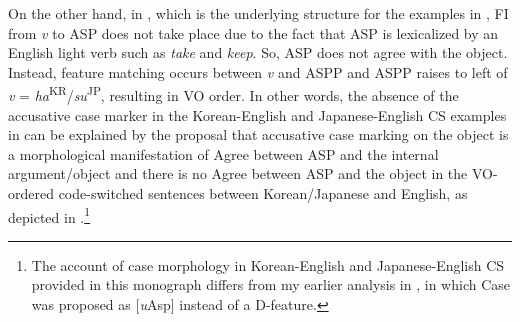 On the other hand, in , which is the underlying structure for the examples in , \ac{FI} from \textit{v} to \ac{ASP} does not take place due to the fact that \ac{ASP} is lexicalized by an English light verb such as \textit{take} and \textit{keep}. So, \ac{ASP} does not agree with the object. Instead, feature matching occurs between \textit{v} and \ac{ASP}P and \ac{ASP}P raises to left of \textit{v} = \textit{ha}\textsuperscript{KR}/\textit{su}\textsuperscript{JP}, resulting in \ac{VO} order. In other words, the absence of the accusative case marker in the Korean-English and Japanese-English \ac{CS} examples in  can be explained by the proposal that accusative case marking on the object is a morphological manifestation of Agree between \ac{ASP} and the internal argument/object and there is no Agree between \ac{ASP} and the object in the \ac{VO}-ordered code-switched sentences between Korean/Japanese and English, as depicted in .\footnote{\textrm{The account of case morphology in Korean-English and Japanese-English \ac{CS} provided in this monograph differs from my earlier analysis in \citet{DenDikkenShim2011}, in which Case was proposed as [}\textrm{\textit{u}}\textrm{Asp] instead of a D-feature.}}


